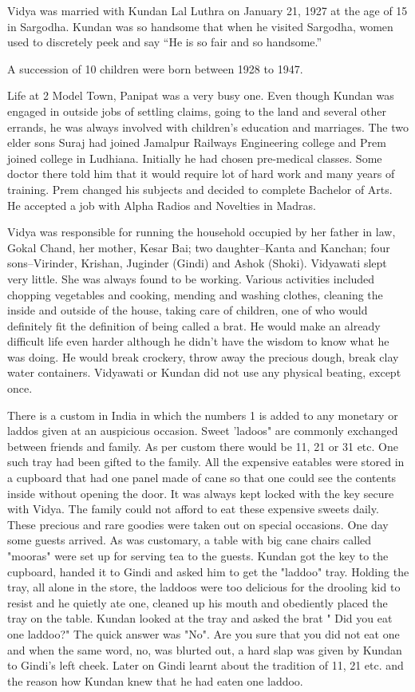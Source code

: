 Vidya was married with Kundan Lal Luthra on January 21, 1927 at the age of 15 in Sargodha. Kundan was so handsome that when he visited Sargodha, women used to discretely peek and say “He is so fair and so handsome.” 

A succession of 10 children were born between 1928 to 1947. 

Life at 2 Model Town, Panipat was a very busy one. Even though Kundan was engaged in outside jobs of settling  claims, going to the land and several other errands, he was always involved with children's education and marriages. The two elder sons Suraj had joined Jamalpur Railways Engineering college and Prem joined college in Ludhiana. Initially he had chosen pre-medical classes. Some doctor there told him that it would require lot of hard work and many years of training. Prem changed his subjects and decided to complete Bachelor of Arts. He accepted a job with Alpha Radios and Novelties in Madras. 

Vidya was responsible for running the household occupied by her father in law, Gokal Chand, her mother, Kesar Bai; two daughter--Kanta and Kanchan; four sons--Virinder, Krishan, Juginder (Gindi) and Ashok (Shoki). Vidyawati slept very little. She was always found to be working. Various activities included chopping vegetables and cooking, mending and washing clothes, cleaning the inside and outside of the house, taking care of children, one of who would definitely fit the definition of being called a brat. He would make an already difficult life even harder although he didn't have the wisdom to know what he was doing. He would break crockery, throw away the precious dough, break clay water containers. Vidyawati or Kundan did not use any physical beating, except once. 

There is a custom in India in which the numbers 1 is added to any monetary or laddos given at an auspicious occasion. Sweet 'ladoos" are commonly exchanged between friends and family. As per custom there would be 11, 21 or 31 etc. One such tray had been gifted to the family. All the expensive eatables were stored in a cupboard that had one panel made of cane so that one could see the contents inside without opening the door. It was always kept locked with the key secure with Vidya. The family could not afford to eat these expensive sweets daily. These precious and rare goodies were taken out on special occasions. One day  some guests arrived. As was customary, a table with big cane chairs called "mooras" were set up for serving tea to the guests. Kundan got the key to the cupboard, handed it to Gindi and 
asked him to get the "laddoo" tray. Holding the tray, all alone in the store, the laddoos were too delicious for the drooling kid to resist and he quietly ate one, cleaned up his mouth and obediently placed the tray on the table. Kundan looked at the tray and asked the brat " Did you eat one laddoo?" The quick answer was "No". Are you sure that you did not eat one and when the same word, no, was blurted out, a hard slap was given by Kundan to Gindi's left cheek. Later on Gindi learnt about the tradition of  11, 21 etc. and the reason how Kundan knew that he had eaten one laddoo. 


